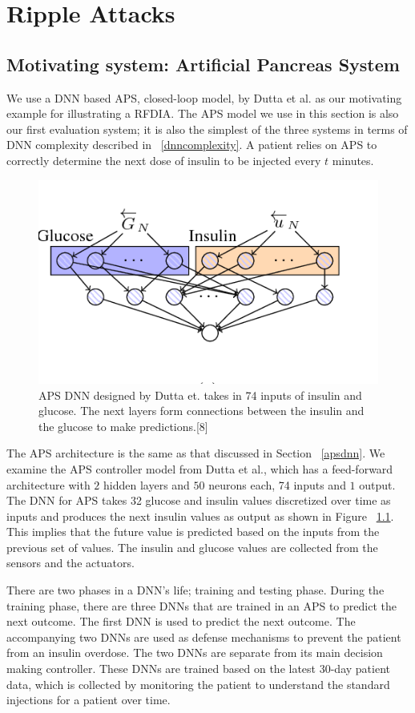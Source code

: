 \chapter{Ripple Attacks}
\label{attack}

\section{Motivating system: Artificial Pancreas System}


We use a DNN based \ac{APS}, closed-loop model, by Dutta et al. \cite{10.1007/978-3-319-99429-1_11}  as our motivating example for illustrating a \ac{RFDIA}. 
The \ac{APS} model we use in this section is also our first evaluation system; it is also the simplest of the three systems in terms of \ac{DNN} complexity described in ~\ref{dnncomplexity}.
A patient relies on  \ac{APS} to correctly determine the next dose of insulin to be injected every $t$ minutes. 

\begin{figure}
	\centering
	\includegraphics[width=0.7\linewidth, height=0.3\linewidth]{Images/APSDNN}
	\caption[APS DNN]{APS DNN designed by Dutta et. takes in 74 inputs of insulin and glucose. The next layers form connections between the insulin and the glucose to make predictions.[8]}
	\label{fig:apsdnn}
\end{figure}

The APS architecture is  the same as that discussed in Section ~\ref{apsdnn}. 
We examine the \ac{APS} controller model from Dutta et al., which has a feed-forward architecture with $2$ hidden layers and $50$ neurons each, 74 inputs and $1$ output. 
The DNN for APS takes 32 glucose and insulin values discretized over time as inputs and produces the next insulin values as output as shown in Figure ~\ref{fig:apsdnn}. 
 This implies that the future value is predicted based on the inputs from the previous set of values. 
The insulin and glucose values are collected from the sensors and the actuators. 



There are two phases in a \ac{DNN}'s life; training and testing phase. 
During the training phase, there are three \ac{DNN}s that are trained in an \ac{APS} to predict the next outcome. 
The first \ac{DNN} is used to predict the next outcome. 
The accompanying two \ac{DNN}s are used as defense mechanisms to prevent the patient from an insulin overdose.  
The two \ac{DNN}s are separate from its main decision making controller. 
These \ac{DNN}s are trained based on the latest 30-day patient data, which is collected by monitoring the patient to understand the standard injections for a patient over time. 

